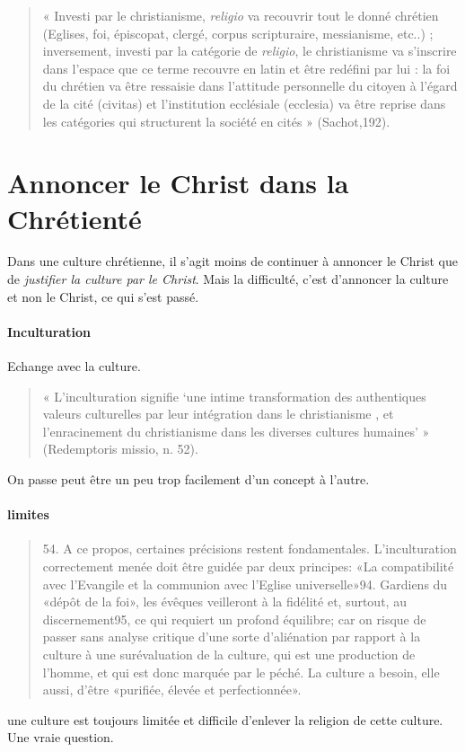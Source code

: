 \begin{quote}
     « Investi par le christianisme, \textit{religio} va recouvrir tout le donné chrétien (Eglises, foi, épiscopat, clergé, corpus scripturaire, messianisme, etc..) ; inversement, investi par la catégorie de \textit{religio}, le christianisme va s’inscrire dans l’espace que ce terme recouvre en latin et être redéfini par lui : la foi du chrétien va être ressaisie dans l’attitude personnelle du citoyen à l’égard de la cité (civitas) et l’institution ecclésiale (ecclesia) va être reprise dans les catégories qui structurent la société en cités » (Sachot,192).
\end{quote}


\section{Annoncer le Christ dans la Chrétienté}

Dans une culture chrétienne, il s'agit moins de continuer à annoncer le Christ que de \textit{justifier la culture par le Christ}. 
Mais la difficulté, c'est d'annoncer la culture et non le Christ, ce qui s'est passé. 


\paragraph{Inculturation} Echange avec la culture.  
\begin{quote}
     « L’inculturation signifie ‘une intime transformation des authentiques valeurs culturelles par leur intégration dans le christianisme , et l’enracinement du christianisme dans les diverses cultures humaines’ » (Redemptoris missio, n. 52). 
\end{quote}

On passe peut être un peu trop facilement d'un concept à l'autre.

\paragraph{limites}
\begin{quote}
    54. A ce propos, certaines précisions restent fondamentales. L'inculturation correctement menée doit être guidée par deux principes: «La compatibilité avec l'Evangile et la communion avec l'Eglise universelle»94. Gardiens du «dépôt de la foi», les évêques veilleront à la fidélité et, surtout, au discernement95, ce qui requiert un profond équilibre; car on risque de passer sans analyse critique d'une sorte d'aliénation par rapport à la culture à une surévaluation de la culture, qui est une production de l'homme, et qui est donc marquée par le péché. La culture a besoin, elle aussi, d'être «purifiée, élevée et perfectionnée».
\end{quote}
une culture est toujours limitée et difficile d'enlever la religion de cette culture. Une vraie question.

